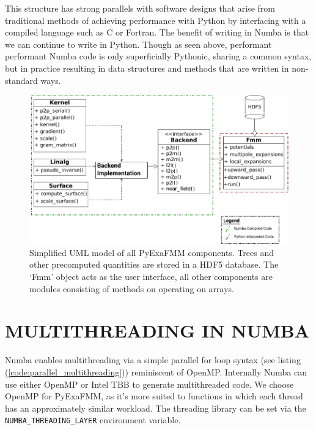 \documentclass{IEEEcsmag}
\begin{document}
This structure has strong parallels with software designs that arise from traditional methods of achieving performance with Python by interfacing with a compiled language such as C or Fortran. The benefit of writing in Numba is that we can continue to write in Python. Though as seen above, performant performant Numba code is only superficially Pythonic, sharing a common syntax, but in practice resulting in data structures and methods that are written in non-standard ways.

\begin{figure}
    \centerline{\includegraphics {figures/software.pdf}}
    \caption{Simplified UML model of all PyExaFMM components. Trees and other precomputed quantities are stored in a HDF5 database. The `Fmm' object acts as the user interface, all other components are modules consisting of methods on operating on arrays.}
    \label{fig:design}
\end{figure}

\section{MULTITHREADING IN NUMBA}

Numba enables multithreading via a simple parallel for loop syntax (see listing (\ref{code:parallel_multithreading})) reminiscent of OpenMP. Internally Numba can use either OpenMP or Intel TBB to generate multithreaded code. We choose OpenMP for PyExaFMM, as it's more suited to functions in which each thread has an approximately similar workload. The threading library can be set via the \lstinline{NUMBA_THREADING_LAYER} environment variable.
\end{document}
